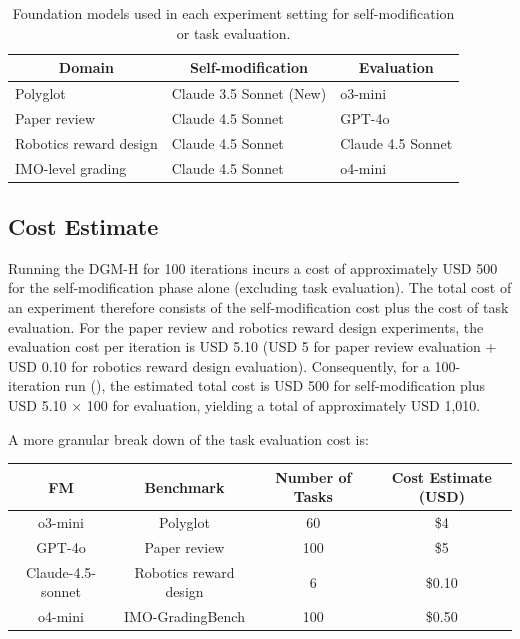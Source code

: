 \documentclass[]{fairmeta}
\begin{document}
\begin{table}[H]
\centering
\caption{Foundation models used in each experiment setting for self-modification or task evaluation.}
\label{tab:fm-hyperparam}
\begin{tabular}{@{}lll@{}}
\toprule
\multicolumn{1}{c}{\textbf{Domain}} & \multicolumn{1}{c}{\textbf{Self-modification}} & \multicolumn{1}{c}{\textbf{Evaluation}} \\ \midrule
Polyglot & Claude 3.5 Sonnet (New) & o3-mini \\
Paper review & Claude 4.5 Sonnet & GPT-4o \\
Robotics reward design & Claude 4.5 Sonnet & Claude 4.5 Sonnet \\
IMO-level grading & Claude 4.5 Sonnet & o4-mini \\ \bottomrule
\end{tabular}
\end{table}

\subsection{Cost Estimate}
\label{app:cost-estimate}

Running the DGM-H for 100 iterations incurs a cost of approximately USD 500 for the self-modification phase alone (excluding task evaluation). The total cost of an experiment therefore consists of the self-modification cost plus the cost of task evaluation. For the paper review and robotics reward design experiments, the evaluation cost per iteration is USD 5.10 (USD 5 for paper review evaluation + USD 0.10 for robotics reward design evaluation). Consequently, for a 100-iteration run (), the estimated total cost is USD 500 for self-modification plus USD 5.10 × 100 for evaluation, yielding a total of approximately USD 1,010.

A more granular break down of the task evaluation cost is:

\begin{table}[H]
\centering
\begin{tabular}{@{}cccc@{}}
\toprule
\textbf{FM} & \textbf{Benchmark} & \textbf{Number of Tasks} & \textbf{Cost Estimate (USD)} \\ \midrule
o3-mini & Polyglot & 60 & \$4 \\
GPT-4o & Paper review & 100 & \$5 \\
Claude-4.5-sonnet & Robotics reward design & 6 & \$0.10 \\
o4-mini & IMO-GradingBench & 100 & \$0.50 \\ \bottomrule
\end{tabular}
\end{table}
\end{document}
